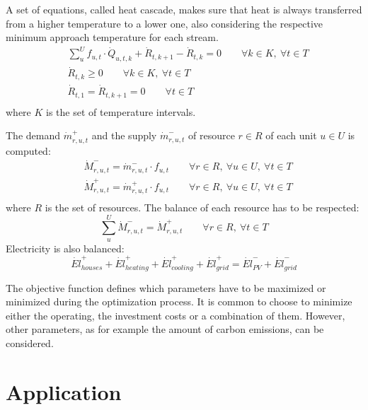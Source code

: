 \documentclass{article}
\begin{document}
A set of equations, called heat cascade, makes sure that heat is always transferred from a higher temperature to a lower one, also considering the respective minimum approach temperature for each stream.
\begin{align}
& \sum_{u}^{U} f_{u,t}  \cdot \dot{Q}_{u,t,k} + \dot{R}_{t,k+1} - \dot{R}_{t,k} = 0 \qquad \forall k \in K, \ \forall t \in T \\
& \dot{R}_{t,k} \geq 0 \qquad \forall k \in K, \ \forall t \in T  \\
& \dot{R}_{t,1} = \dot{R}_{t,k+1} = 0 \qquad \forall t \in T  \\
\end{align}
where $K$ is the set of temperature intervals.

The demand $\dot{m}_{r,u,t}^{+}$ and the supply $\dot{m}_{r,u,t}^{-}$ of resource $r \in R$ of each unit $u \in U$ is computed:
\begin{align}
& \dot{M}_{r,u,t}^{-} = \dot{m}_{r,u,t}^{-} \cdot f_{u,t} \qquad \forall r \in R, \ \forall u \in U, \ \forall t \in T \\
& \dot{M}_{r,u,t}^{+} = \dot{m}_{r,u,t}^{+} \cdot f_{u,t} \qquad \forall r \in R, \ \forall u \in U, \ \forall t \in T  \\
\end{align}
where $R$ is the set of resources. 
The balance of each resource has to be respected:
\begin{equation}
\sum_{u}^{U} \dot{M}_{r,u,t}^{-} = \dot{M}_{r,u,t}^{+} \qquad \forall r \in R, \ \forall t \in T
\end{equation}
Electricity is also balanced:
\begin{equation}
\dot{El}_{houses}^{+} + \dot{El}_{heating}^{+} + \dot{El}_{cooling}^{+} + \dot{El}_{grid}^{+} = \dot{El}_{PV}^{-} + \dot{El}_{grid}^{-}
\end{equation}

The objective function defines which parameters have to be maximized or minimized during the optimization process. It is common to choose to minimize either the operating, the investment costs or a combination of them. However, other parameters, as for example the amount of carbon emissions, can be considered.



\newpage
\section{Application}
\end{document}
